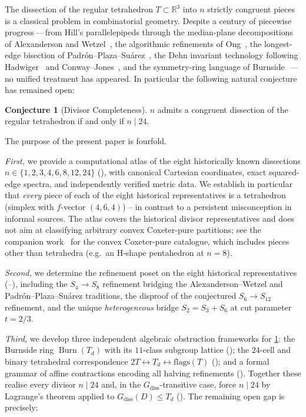 \documentclass[11pt,a4paper]{article}
\theoremstyle{plain}
\theoremstyle{definition}
\newtheorem{conjecture}[conjecture]{Conjecture}
\theoremstyle{remark}
\DeclareMathOperator{\Burn}{Burn}
\newcommand{\Td}{T_{\!d}}
\newcommand{\R}{\mathbb{R}}
\begin{document}
The dissection of the regular tetrahedron $T \subset \R^{3}$ into $n$ strictly
congruent pieces is a classical problem in combinatorial geometry.  Despite a
century of piecewise progress\,---\,from Hill's parallelepipeds
\cite{Hill1895} through the median-plane decompositions of Alexanderson and
Wetzel~\cite{AW1971}, the algorithmic refinements of Ong~\cite{Ong1991}, the
longest-edge bisection of Padr\'on--Plaza--Su\'arez~\cite{PPS2023}, the Dehn
invariant technology following Hadwiger~\cite{Hadwiger1951} and
Conway--Jones~\cite{ConwayJones1976}, and the symmetry-ring language of
Burnside~\cite{Burnside1911,tDieck1979}\,---\,no unified treatment has
appeared.  In particular the following natural conjecture has remained open:

\begin{conjecture}[Divisor Completeness]\label{conj:divisor}
$n$ admits a congruent dissection of the regular tetrahedron if and only if
$n \mid 24$.
\end{conjecture}

The purpose of the present paper is fourfold.

\medskip
\noindent\emph{First,} we provide a computational atlas of the
eight historically known dissections $n \in \{1,2,3,4,6,8,12,24\}$
(), with canonical Cartesian coordinates, exact squared-edge
spectra, and independently verified metric data.  We establish in particular
that \emph{every} piece of each of the eight historical representatives is a
tetrahedron (simplex with $f$-vector $(4,6,4)$) -- in contrast to a
persistent misconception in informal sources.  The atlas covers the
historical divisor representatives and does not aim at classifying arbitrary
convex Coxeter-pure partitions; see the companion
work~\cite{CoxeterPure2026} for the convex Coxeter-pure catalogue, which
includes pieces other than tetrahedra (e.g.\ an H-shape pentahedron at
$n=8$).

\noindent\emph{Second,} we determine the refinement poset on the eight
historical representatives
(--), including the $S_4 \to S_8$
refinement bridging the Alexanderson--Wetzel and Padr\'on--Plaza--Su\'arez
traditions, the disproof of the conjectured $S_6 \to S_{12}$ refinement, and
the unique \emph{heterogeneous} bridge $S_2 = S_3 + S_6$ at cut parameter
$t = 2/3$.

\noindent\emph{Third,} we develop three independent algebraic obstruction
 frameworks for \cref{conj:divisor}: the Burnside ring $\Burn(\Td)$ with its
 $11$-class subgroup lattice (); the $24$-cell and binary
 tetrahedral correspondence $2T \leftrightarrow \Td \leftrightarrow \mathrm{flags}(T)$
 (); and a formal grammar of affine contractions encoding all
 halving refinements ().  Together these realise every divisor
 $n \mid 24$ and, in the $G_{\mathrm{diss}}$-transitive case, force $n \mid 24$ by
 Lagrange's theorem applied to $G_{\mathrm{diss}}(D) \leq \Td$
 ().  The remaining open gap is precisely:
\end{document}
